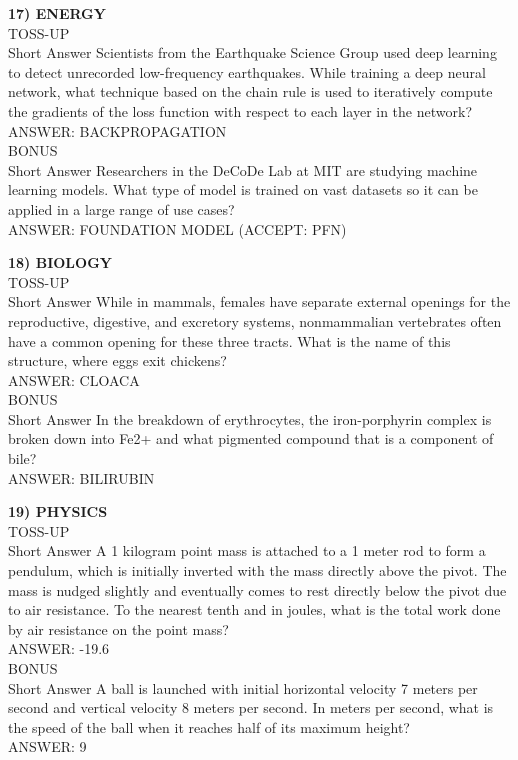 \documentclass{article}
\begin{document}
\noindent \textbf{17) ENERGY} \\
TOSS-UP \\
Short Answer Scientists from the Earthquake Science Group used deep learning to detect unrecorded low-frequency earthquakes. While training a deep neural network, what technique based on the chain rule is used to iteratively compute the gradients of the loss function with respect to each layer in the network? \\
ANSWER: BACKPROPAGATION \\
BONUS \\
Short Answer Researchers in the DeCoDe Lab at MIT are studying machine learning models. What type of model is trained on vast datasets so it can be applied in a large range of use cases? \\
ANSWER: FOUNDATION MODEL (ACCEPT: PFN)

\noindent \textbf{18) BIOLOGY} \\
TOSS-UP \\
Short Answer While in mammals, females have separate external openings for the reproductive, digestive, and excretory systems, nonmammalian vertebrates often have a common opening for these three tracts. What is the name of this structure, where eggs exit chickens? \\
ANSWER: CLOACA \\
BONUS \\
Short Answer In the breakdown of erythrocytes, the iron-porphyrin complex is broken down into Fe2+ and what pigmented compound that is a component of bile? \\
ANSWER: BILIRUBIN

\noindent \textbf{19) PHYSICS} \\
TOSS-UP \\
Short Answer A 1 kilogram point mass is attached to a 1 meter rod to form a pendulum, which is initially inverted with the mass directly above the pivot. The mass is nudged slightly and eventually comes to rest directly below the pivot due to air resistance. To the nearest tenth and in joules, what is the total work done by air resistance on the point mass? \\
ANSWER: -19.6 \\
BONUS \\
Short Answer A ball is launched with initial horizontal velocity 7 meters per second and vertical velocity 8 meters per second. In meters per second, what is the speed of the ball when it reaches half of its maximum height? \\
ANSWER: 9
\end{document}
